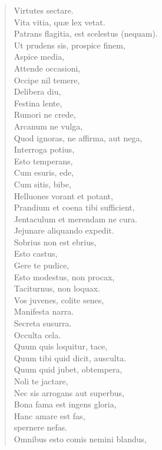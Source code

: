 \begin{verse}

  Virtutes sectare.\\
  Vita vitia, quæ lex vetat.\\
  Patrans flagitia, est scelestus (nequam).\\
  Ut prudens sis, prospice finem,\\
  Aspice media,\\
  Attende occasioni,\\
  Occipe nil temere,\\
  Delibera diu,\\
  Festina lente,\\
  Rumori ne crede,\\
  Arcanum ne vulga,\\
  Quod ignoras, ne affirma, aut nega,\\
  Interroga potius,\\
  Esto temperans,\\
  Cum esuris, ede,\\
  Cum sitis, bibe,\\
  Helluones vorant et potant,\\
  Prandium et coena tibi sufficient,\\
  Jentaculum et merendam ne cura.\\
  Jejunare aliquando expedit.\\
  Sobrius non est ebrius,\\
  Esto castus,\\
  Gere te pudice,\\
  Esto modestus, non procax,\\
  Taciturnus, non loquax.\\
  Vos juvenes, colite senes,\\
  Manifesta narra.\\
  Secreta susurra.\\
  Occulta cela.\\
  Quum quis loquitur, tace,\\
  Quum tibi quid dicit, ausculta.\\
  Quum quid jubet, obtempera,\\
  Noli te jactare,\\
  Nec sis arrogans aut superbus,\\
  Bona fama est ingens gloria,\\
  Hanc amare est fas,\\
  spernere nefas.\\
  Omnibus esto comis nemini blandus,\\

\end{verse}

